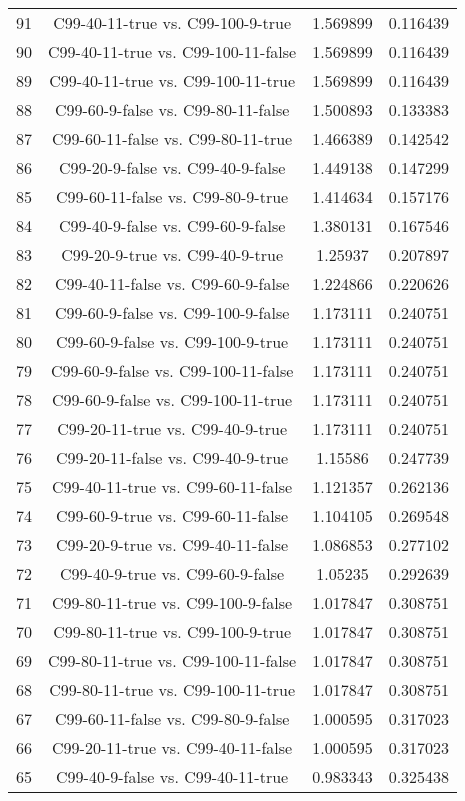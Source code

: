 \documentclass[a4paper,10pt]{article}
\begin{document}
\begin{landscape}
\begin{table}[!htp]
\begin{tabular}{cccc}
91&C99-40-11-true vs. C99-100-9-true&1.569899&0.116439\\
90&C99-40-11-true vs. C99-100-11-false&1.569899&0.116439\\
89&C99-40-11-true vs. C99-100-11-true&1.569899&0.116439\\
88&C99-60-9-false vs. C99-80-11-false&1.500893&0.133383\\
87&C99-60-11-false vs. C99-80-11-true&1.466389&0.142542\\
86&C99-20-9-false vs. C99-40-9-false&1.449138&0.147299\\
85&C99-60-11-false vs. C99-80-9-true&1.414634&0.157176\\
84&C99-40-9-false vs. C99-60-9-false&1.380131&0.167546\\
83&C99-20-9-true vs. C99-40-9-true&1.25937&0.207897\\
82&C99-40-11-false vs. C99-60-9-false&1.224866&0.220626\\
81&C99-60-9-false vs. C99-100-9-false&1.173111&0.240751\\
80&C99-60-9-false vs. C99-100-9-true&1.173111&0.240751\\
79&C99-60-9-false vs. C99-100-11-false&1.173111&0.240751\\
78&C99-60-9-false vs. C99-100-11-true&1.173111&0.240751\\
77&C99-20-11-true vs. C99-40-9-true&1.173111&0.240751\\
76&C99-20-11-false vs. C99-40-9-true&1.15586&0.247739\\
75&C99-40-11-true vs. C99-60-11-false&1.121357&0.262136\\
74&C99-60-9-true vs. C99-60-11-false&1.104105&0.269548\\
73&C99-20-9-true vs. C99-40-11-false&1.086853&0.277102\\
72&C99-40-9-true vs. C99-60-9-false&1.05235&0.292639\\
71&C99-80-11-true vs. C99-100-9-false&1.017847&0.308751\\
70&C99-80-11-true vs. C99-100-9-true&1.017847&0.308751\\
69&C99-80-11-true vs. C99-100-11-false&1.017847&0.308751\\
68&C99-80-11-true vs. C99-100-11-true&1.017847&0.308751\\
67&C99-60-11-false vs. C99-80-9-false&1.000595&0.317023\\
66&C99-20-11-true vs. C99-40-11-false&1.000595&0.317023\\
65&C99-40-9-false vs. C99-40-11-true&0.983343&0.325438\\

\end{tabular}
\end{table}
\end{landscape}
\end{document}
